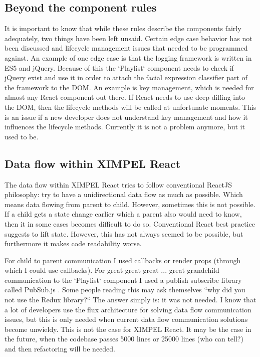 \subsection{Beyond the component rules}
It is important to know that while these rules describe the components fairly adequately, two things have been left unsaid. Certain edge case behavior has not been discussed and lifecycle management issues that needed to be programmed against. An example of one edge case is that the logging framework is written in ES5 and jQuery. Because of this the `Playlist` component needs to check if jQuery exist and use it in order to attach the facial expression classifier part of the framework to the DOM. An example is key management, which is needed for almost any React component out there. If React needs to use deep diffing into the DOM, then the lifecycle methods will be called at unfortunate moments. This is an issue if a new developer does not understand key management and how it influences the lifecycle methods. Currently it is not a problem anymore, but it used to be.

\subsection{Data flow within XIMPEL React}
The data flow within XIMPEL React tries to follow conventional ReactJS philosophy: try to have a unidirectional data flow as much as possible. Which means data flowing from parent to child. However, sometimes this is not possible. If a child gets a state change earlier which a parent also would need to know, then it in some cases becomes difficult to do so. Conventional React best practice suggests to lift state. However, this has not always seemed to be possible, but furthermore it makes code readability worse.

For child to parent communication I used callbacks or render props (through which I could use callbacks). For great great great ... great grandchild communication to the `Playlist` component I used a publish subscribe library called PubSub.js \cite{pubsubJS}. Some people reading this may ask themselves ``why did you not use the Redux library?`` The answer simply is: it was not needed. I know that a lot of developers use the flux architecture for solving data flow communication issues, but this is only needed when current data flow communication solutions become unwieldy. This is not the case for XIMPEL React. It may be the case in the future, when the codebase passes 5000 lines or 25000 lines (who can tell?) and then refactoring will be needed.

